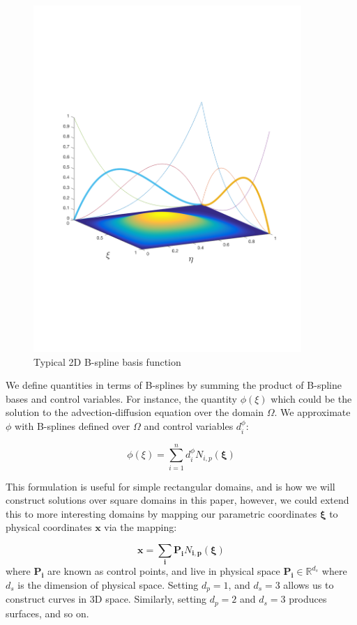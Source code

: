 \documentclass[../background.tex]{subfiles}
\begin{document}
\begin{figure}[!htbp]
  \centerline{\includegraphics[width=4in]{./figures/2DBSpline_p3}}
  \caption{Typical 2D B-spline basis function}
  \label{fig:BSplines2D}
\end{figure}

We define quantities in terms of B-splines by summing the product of B-spline bases and control variables. For instance, the quantity $\phi(\xi)$ which could be the solution to the advection-diffusion equation over the domain $\Omega$. We approximate $\phi$ with B-splines defined over $\Omega$ and control variables $d^{\phi}_i$:

\begin{equation}
\phi(\xi) = \sum_{i=1}^n d^{\phi}_i N_{i,p}(\boldsymbol{\xi})
\end{equation}

This formulation is useful for simple rectangular domains, and is how we will construct solutions over square domains in this paper, however, we could extend this to more interesting domains by mapping our parametric coordinates $\boldsymbol{\xi}$ to physical coordinates $\mathbf{x}$ via the mapping:

\begin{equation}
\mathbf{x}= \sum_{\mathbf{i}} \mathbf{P}_{\mathbf{i}} N_{\mathbf{i},\mathbf{p}}(\boldsymbol{\xi})
\end{equation}
where $\mathbf{P_i}$ are known as control points, and live in physical space $\mathbf{P_i} \in \mathbb{R}^{d_s}$ where $d_s$ is the dimension of physical space. Setting $d_p = 1$, and $d_s = 3$ allows us to construct curves in 3D space. Similarly, setting $d_p = 2$ and $d_s = 3$ produces surfaces, and so on. 
\end{document}

